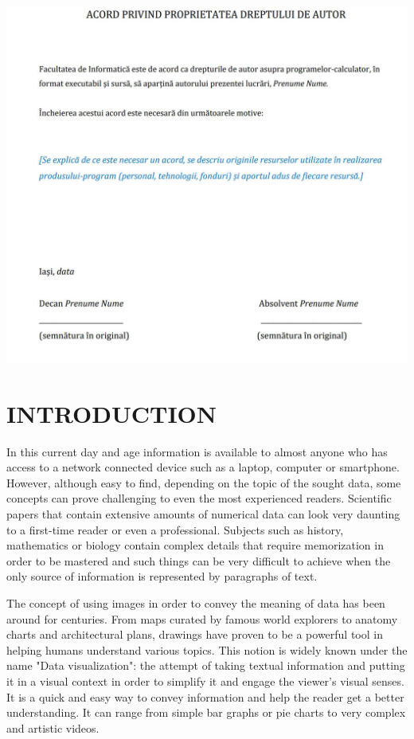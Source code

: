 \documentclass{report}
\begin{document}
\centerline{\includegraphics[scale=1.1]{anexa6}}
 \tableofcontents

\newpage
 \section* {INTRODUCTION}
In this current day and age information is available to almost anyone who has access to a network connected device such as a laptop, computer or smartphone. However, although easy to find, depending on the topic of the sought data, some concepts can prove challenging to even the most experienced readers. Scientific papers that contain extensive amounts of numerical data can look very daunting to a first-time reader or even a professional. Subjects such as history, mathematics or biology contain complex details that require memorization in order to be mastered and such things can be very difficult to achieve when the only source of information is represented by paragraphs of text. \par

The concept of using images in order to convey the meaning of data has been around for centuries. From maps curated by famous world explorers to anatomy charts and architectural plans, drawings have proven to be a powerful tool in helping humans understand various topics. This notion is widely known under the name "Data visualization": the attempt of taking textual information and putting it in a visual context in order to simplify it and engage the viewer's visual senses. It is a quick and easy way to convey information and help the reader get a better understanding. It can range from simple bar graphs or pie charts to very complex and artistic videos. \par
\end{document}
